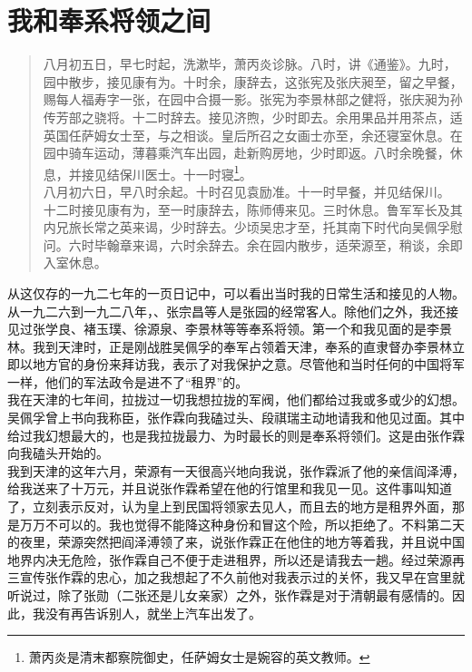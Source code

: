 \fancyhead[RO]{} %
\fancyhead[LE]{} %
\chapter*{我和奉系将领之间}
\thispagestyle{empty}
\begin{quote}
	八月初五日，早七时起，洗漱毕，萧丙炎诊脉。八时，讲《通鉴》。九时，园中散步，接见康有为。十时余，康辞去，这张宪及张庆昶至，留之早餐，赐每人福寿字一张，在园中合摄一影。张宪为李景林部之健将，张庆昶为孙传芳部之骁将。十二时辞去。接见济煦，少时即去。余用果品并用茶点，适英国任萨姆女士至，与之相谈。皇后所召之女画士亦至，余还寝室休息。在园中骑车运动，薄暮乘汽车出园，赴新购房地，少时即返。八时余晚餐，休息，并接见结保川医士。十一时寝\footnote{萧丙炎是清末都察院御史，任萨姆女士是婉容的英文教师。}。\\

八月初六日，早八时余起。十时召见袁励准。十一时早餐，并见结保川。\\

十二时接见康有为，至一时康辞去，陈师傅来见。三时休息。鲁军军长及其内兄旅长常之英来谒，少时辞去。少顷吴忠才至，托其南下时代向吴佩孚慰问。六时毕翰章来谒，六时余辞去。余在园内散步，适荣源至，稍谈，余即入室休息。\\
\end{quote}

从这仅存的一九二七年的一页日记中，可以看出当时我的日常生活和接见的人物。从一九二六到一九二八年，、张宗昌等人是张园的经常客人。除他们之外，我还接见过张学良、褚玉璞、徐源泉、李景林等等奉系将领。第一个和我见面的是李景林。我到天津时，正是刚战胜吴佩孚的奉军占领着天津，奉系的直隶督办李景林立即以地方官的身份来拜访我，表示了对我保护之意。尽管他和当时任何的中国将军一样，他们的军法政令是进不了“租界”的。\\

我在天津的七年间，拉拢过一切我想拉拢的军阀，他们都给过我或多或少的幻想。吴佩孚曾上书向我称臣，张作霖向我磕过头、段祺瑞主动地请我和他见过面。其中给过我幻想最大的，也是我拉拢最力、为时最长的则是奉系将领们。这是由张作霖向我磕头开始的。\\

我到天津的这年六月，荣源有一天很高兴地向我说，张作霖派了他的亲信阎泽溥，给我送来了十万元，并且说张作霖希望在他的行馆里和我见一见。这件事叫知道了，立刻表示反对，认为皇上到民国将领家去见人，而且去的地方是租界外面，那是万万不可以的。我也觉得不能降这种身份和冒这个险，所以拒绝了。不料第二天的夜里，荣源突然把阎泽溥领了来，说张作霖正在他住的地方等着我，并且说中国地界内决无危险，张作霖自己不便于走进租界，所以还是请我去一趟。经过荣源再三宣传张作霖的忠心，加之我想起了不久前他对我表示过的关怀，我又早在宫里就听说过，除了张勋（二张还是儿女亲家）之外，张作霖是对于清朝最有感情的。因此，我没有再告诉别人，就坐上汽车出发了。\\

